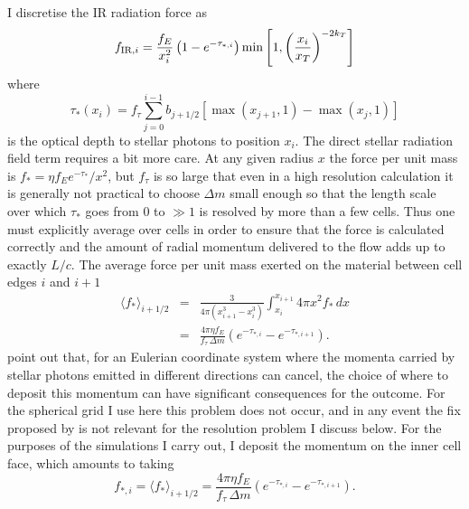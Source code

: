 \documentclass[useAMS,usenatbib]{mn2e}
\begin{document}
I discretise the IR radiation force as
\begin{equation}
f_{{\rm IR},i} = \frac{f_E}{x_i^2} \left(1 - e^{-\tau_{*,i}}\right) \min\left[1, \left(\frac{x_i}{x_T}\right)^{-2k_T}\right]
\end{equation}
where 
\begin{equation}
\tau_*(x_i) = f_\tau \sum_{j=0}^{i-1} b_{j+1/2} \left[\max\left(x_{j+1},1\right) - \max\left(x_j,1\right)\right]
\end{equation}
is the optical depth to stellar photons to position $x_i$. The direct stellar radiation field term requires a bit more care. At any given radius $x$ the force per unit mass is $f_* = \eta f_E e^{-\tau_*}/x^2$, but $f_\tau$ is so large that even in a high resolution calculation it is generally not practical to choose $\Delta m$ small enough so that the length scale over which $\tau_*$ goes from 0 to $\gg 1$ is resolved by more than a few cells. Thus one must explicitly average over cells in order to ensure that the force is calculated correctly and the amount of radial momentum delivered to the flow adds up to exactly $L/c$. The average force per unit mass exerted on the material between cell edges $i$ and $i+1$
\begin{eqnarray}
\langle f_*\rangle_{i+1/2} & = & \frac{3}{4\pi \left(x_{i+1}^3-x_i^3\right)} \int_{x_{i}}^{x_{i+1}} 4\pi x^2 f_* \, dx \\
& = & \frac{4\pi \eta f_E}{f_\tau\, \Delta m} \left(e^{-\tau_{*,i}} - e^{-\tau_{*,i+1}}\right).
\end{eqnarray}
\citet{hopkins18a} point out that, for an Eulerian coordinate system where the momenta carried by stellar photons emitted in different directions can cancel, the choice of where to deposit this momentum can have significant consequences for the outcome. For the spherical grid I use here this problem does not occur, and in any event the fix proposed by \citet{hopkins18a} is not relevant for the resolution problem I discuss below. For the purposes of the simulations I carry out, I deposit the momentum on the inner cell face, which amounts to taking
\begin{equation}
f_{*,i} = \langle f_*\rangle_{i+1/2} = \frac{4\pi \eta f_E}{f_\tau\, \Delta m} \left(e^{-\tau_{*,i}} - e^{-\tau_{*,i+1}}\right).
\end{equation}
\end{document}
